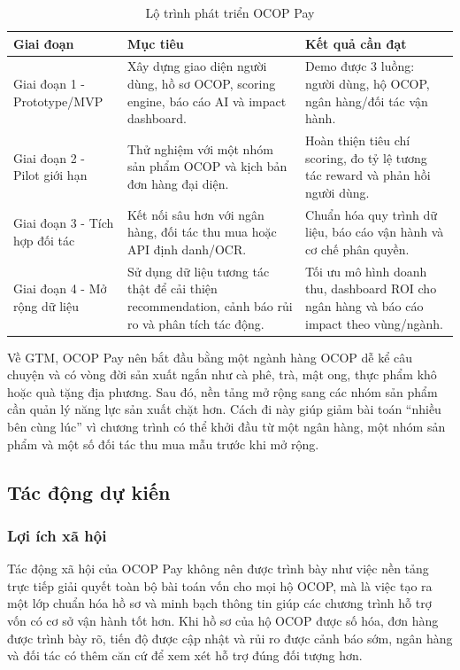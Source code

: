 \documentclass[13pt,a4paper]{extarticle}
\begin{document}
\begin{table}[H]
\centering
\caption{Lộ trình phát triển OCOP Pay}
\begin{tabular}{|p{3cm}|p{5cm}|p{5cm}|}
\hline
\textbf{Giai đoạn} & \textbf{Mục tiêu} & \textbf{Kết quả cần đạt} \\
\hline
Giai đoạn 1 - Prototype/MVP & Xây dựng giao diện người dùng, hồ sơ OCOP, scoring engine, báo cáo AI và impact dashboard. & Demo được 3 luồng: người dùng, hộ OCOP, ngân hàng/đối tác vận hành. \\
\hline
Giai đoạn 2 - Pilot giới hạn & Thử nghiệm với một nhóm sản phẩm OCOP và kịch bản đơn hàng đại diện. & Hoàn thiện tiêu chí scoring, đo tỷ lệ tương tác reward và phản hồi người dùng. \\
\hline
Giai đoạn 3 - Tích hợp đối tác & Kết nối sâu hơn với ngân hàng, đối tác thu mua hoặc API định danh/OCR. & Chuẩn hóa quy trình dữ liệu, báo cáo vận hành và cơ chế phân quyền. \\
\hline
Giai đoạn 4 - Mở rộng dữ liệu & Sử dụng dữ liệu tương tác thật để cải thiện recommendation, cảnh báo rủi ro và phân tích tác động. & Tối ưu mô hình doanh thu, dashboard ROI cho ngân hàng và báo cáo impact theo vùng/ngành. \\
\hline
\end{tabular}
\end{table}

Về GTM, OCOP Pay nên bắt đầu bằng một ngành hàng OCOP dễ kể câu chuyện và có vòng đời sản xuất ngắn như cà phê, trà, mật ong, thực phẩm khô hoặc quà tặng địa phương. Sau đó, nền tảng mở rộng sang các nhóm sản phẩm cần quản lý năng lực sản xuất chặt hơn. Cách đi này giúp giảm bài toán “nhiều bên cùng lúc” vì chương trình có thể khởi đầu từ một ngân hàng, một nhóm sản phẩm và một số đối tác thu mua mẫu trước khi mở rộng.

\subsection{Tác động dự kiến}

\subsubsection{Lợi ích xã hội}

Tác động xã hội của OCOP Pay không nên được trình bày như việc nền tảng trực tiếp giải quyết toàn bộ bài toán vốn cho mọi hộ OCOP, mà là việc tạo ra một lớp chuẩn hóa hồ sơ và minh bạch thông tin giúp các chương trình hỗ trợ vốn có cơ sở vận hành tốt hơn. Khi hồ sơ của hộ OCOP được số hóa, đơn hàng được trình bày rõ, tiến độ được cập nhật và rủi ro được cảnh báo sớm, ngân hàng và đối tác có thêm căn cứ để xem xét hỗ trợ đúng đối tượng hơn.
\end{document}
